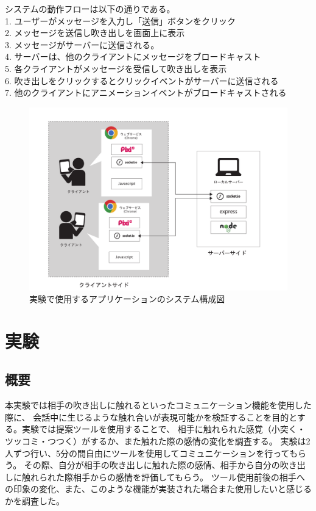 \documentclass[11pt,a4paper]{ltjsreport}
\begin{document}
システムの動作フローは以下の通りである。\\
1. ユーザーがメッセージを入力し「送信」ボタンをクリック\\
2. メッセージを送信し吹き出しを画面上に表示\\
3. メッセージがサーバーに送信される。\\
4. サーバーは、他のクライアントにメッセージをブロードキャスト\\
5. 各クライアントがメッセージを受信して吹き出しを表示\\
6. 吹き出しをクリックするとクリックイベントがサーバーに送信される\\
7. 他のクライアントにアニメーションイベントがブロードキャストされる

\begin{figure}[htbp]
    \begin{center}
        \includegraphics[width=150mm]{PDF/system_2.pdf}
        \caption{実験で使用するアプリケーションのシステム構成図}
        \label{figure:system}
    \end{center}
\end{figure}


\section{実験}

\subsection{概要}
本実験では相手の吹き出しに触れるといったコミュニケーション機能を使用した際に、
会話中に生じるような触れ合いが表現可能かを検証することを目的とする。実験では提案ツールを使用することで、
相手に触れられた感覚（小突く・ツッコミ・つつく）がするか、また触れた際の感情の変化を調査する。
実験は2人ずつ行い、5分の間自由にツールを使用してコミュニケーションを行ってもらう。
その際、自分が相手の吹き出しに触れた際の感情、相手から自分の吹き出しに触れられた際相手からの感情を評価してもらう。
ツール使用前後の相手への印象の変化、また、このような機能が実装された場合また使用したいと感じるかを調査した。
\end{document}
